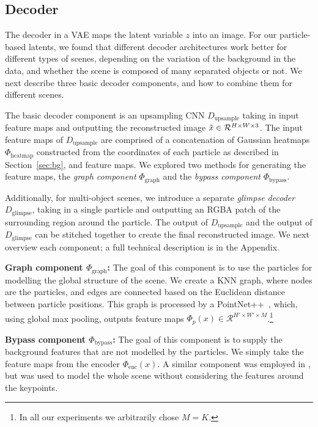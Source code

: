 \documentclass[nohyperref]{article}
\theoremstyle{plain}
\theoremstyle{definition}
\theoremstyle{remark}
\newcommand{\encftrs}{\Phi_{\textrm{enc}}}
\newcommand{\heatmapftrs}{\Phi_{\textrm{heatmap}}}
\newcommand{\dbypass}{\Phi_{\textrm{bypass}}}
\newcommand{\dgraph}{\Phi_{\textrm{graph}}}
\newcommand{\dglimpse}{D_{\textrm{glimpse}}}
\newcommand{\dupsample}{D_{\textrm{upsample}}}
\begin{document}
\subsection{Decoder}
\label{subsec:kp_dec}
The decoder in a VAE maps the latent variable $z$ into an image. For our  particle-based latents, we found that different decoder architectures work better for different types of scenes, depending on the variation of the background in the data, and whether the scene is composed of many separated objects or not. We next describe three basic decoder components, and how to combine them for different scenes.

The basic decoder component is an upsampling CNN $\dupsample$ 
taking in input feature maps 
and outputting the reconstructed image $\Tilde{x} \in \mathcal{R}^{H \times W \times 3}$. The input feature maps of $\dupsample$ are comprised of a concatenation of Gaussian heatmaps $\heatmapftrs$ constructed from the coordinates of each particle as described in Section~\ref{sec:bg}, and feature maps. We explored two methods for  generating the feature maps, the \textit{graph component} $\dgraph$ and the  \textit{bypass component} $\dbypass$. 

Additionally, for multi-object scenes, we introduce a separate \textit{glimpse decoder} $\dglimpse$, taking in a single particle and outputting an RGBA patch of the surrounding region around the particle. The output of $\dupsample$ and the output of $\dglimpse$ can be stitched together to create the final reconstructed image. We next overview each component; a full technical description is in the Appendix.

\textbf{Graph component $\dgraph$:} The goal of this component is to use the particles for modelling the global structure of the scene. We create a KNN graph, where nodes are the particles, and edges are connected based on the Euclidean distance between particle positions. This graph is processed by a PointNet++~\citep{qi2017pointnet++}, which, using global max pooling, outputs feature maps $\Phi_p(x) \in \mathcal{R}^{H' \times W' \times M}$.\footnote{In all our experiments we arbitrarily chose $M=K$.}


\textbf{Bypass component $\dbypass$:} The goal of this component is to supply the background features that are not modelled by the particles.
We simply take the feature maps from the encoder $\encftrs(x)$.
A similar component was employed in \citet{jakab2018unsupervised}, but was used to model the whole scene without considering the features around the keypoints.
\end{document}
